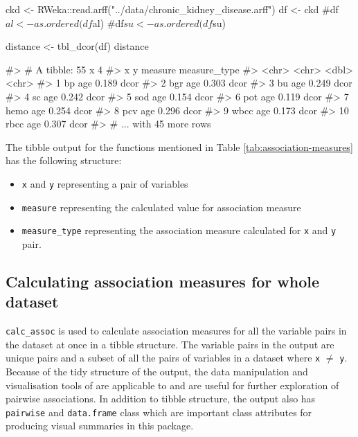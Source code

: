 \begin{Schunk}
\begin{Sinput}
ckd <- RWeka::read.arff("../data/chronic_kidney_disease.arff")
df <- ckd
#df$al <- as.ordered(df$al)
#df$su <- as.ordered(df$su)

distance <- tbl_dcor(df)
distance
\end{Sinput}
\begin{Soutput}
#> # A tibble: 55 x 4
#>    x     y     measure measure_type
#>    <chr> <chr>   <dbl> <chr>       
#>  1 bp    age     0.189 dcor        
#>  2 bgr   age     0.303 dcor        
#>  3 bu    age     0.249 dcor        
#>  4 sc    age     0.242 dcor        
#>  5 sod   age     0.154 dcor        
#>  6 pot   age     0.119 dcor        
#>  7 hemo  age     0.254 dcor        
#>  8 pcv   age     0.296 dcor        
#>  9 wbcc  age     0.173 dcor        
#> 10 rbcc  age     0.307 dcor        
#> # ... with 45 more rows
\end{Soutput}
\end{Schunk}

The tibble output for the functions mentioned in Table
\ref{tab:association-measures} has the following structure:

\begin{itemize}
\tightlist
\item
  \texttt{x} and \texttt{y} representing a pair of variables
\item
  \texttt{measure} representing the calculated value for association
  measure
\item
  \texttt{measure\_type} representing the association measure calculated
  for \texttt{x} and \texttt{y} pair.
\end{itemize}

\hypertarget{calculating-association-measures-for-whole-dataset}{%
\subsection{Calculating association measures for whole
dataset}\label{calculating-association-measures-for-whole-dataset}}

\texttt{calc\_assoc} is used to calculate association measures for all
the variable pairs in the dataset at once in a tibble structure. The
variable pairs in the output are unique pairs and a subset of all the
pairs of variables in a dataset where \texttt{x} \(\neq\) \texttt{y}.
Because of the tidy structure of the output, the data manipulation and
visualisation tools of  \citep{tidyverse} are
applicable to and are useful for further exploration of pairwise
associations. In addition to tibble structure, the output also has
\texttt{pairwise} and \texttt{data.frame} class which are important
class attributes for producing visual summaries in this package.

